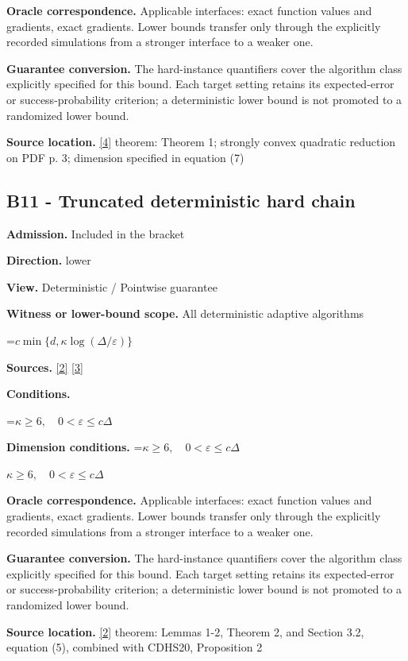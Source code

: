 \documentclass[10pt,a4paper]{article}
\newcommand{\AtlasMath}[1]{\par\begingroup\centering\setbox0=\hbox{$\displaystyle #1$}\ifdim\wd0>1.4\linewidth\typeout{ATLAS WIDE FORMULA: \the\wd0}\fi\ifdim\wd0>\linewidth\resizebox{\linewidth}{!}{\box0}\else\box0\fi\par\endgroup}
\newcommand{\AtlasInlineMath}[1]{\begingroup\setbox0=\hbox{$#1$}\ifdim\wd0>.4\linewidth\endgroup\AtlasMath{#1}\else\endgroup$#1$\fi}
\begin{document}
\textbf{Oracle correspondence.} Applicable interfaces: exact function values and gradients, exact gradients. Lower bounds transfer only through the explicitly recorded simulations from a stronger interface to a weaker one.

\textbf{Guarantee conversion.} The hard-instance quantifiers cover the algorithm class explicitly specified for this bound. Each target setting retains its expected-error or success-probability criterion; a deterministic lower bound is not promoted to a randomized lower bound.

\textbf{Source location.} \href{https://arxiv.org/pdf/2609.10874}{[4]} theorem: Theorem 1; strongly convex quadratic reduction on PDF p. 3; dimension specified in equation (7)

\subsection{B11 - Truncated deterministic hard chain}
\textbf{Admission.} Included in the bracket

\textbf{Direction.} lower

\textbf{View.} Deterministic / Pointwise guarantee

\textbf{Witness or lower-bound scope.} All deterministic adaptive algorithms

\AtlasMath{c\min\{d,\kappa\log(\Delta/\varepsilon)\}}
\textbf{Sources.} \href{https://arxiv.org/pdf/2212.13551}{[2]} \href{https://arxiv.org/pdf/1710.11606}{[3]}

\textbf{Conditions.} 
\AtlasMath{\kappa\ge6,\quad0<\varepsilon\le c\Delta}


\textbf{Dimension conditions.} \AtlasInlineMath{\kappa\ge6,\quad0<\varepsilon\le c\Delta}

\textbf{Oracle correspondence.} Applicable interfaces: exact function values and gradients, exact gradients. Lower bounds transfer only through the explicitly recorded simulations from a stronger interface to a weaker one.

\textbf{Guarantee conversion.} The hard-instance quantifiers cover the algorithm class explicitly specified for this bound. Each target setting retains its expected-error or success-probability criterion; a deterministic lower bound is not promoted to a randomized lower bound.

\textbf{Source location.} \href{https://arxiv.org/pdf/2212.13551}{[2]} theorem: Lemmas 1-2, Theorem 2, and Section 3.2, equation (5), combined with CDHS20, Proposition 2
\end{document}
